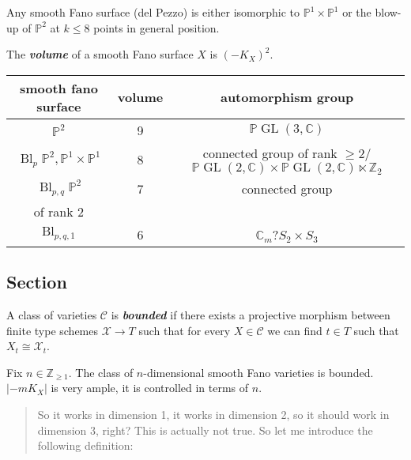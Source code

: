 \begin{thm}
	Any smooth Fano surface (del Pezzo) is either isomorphic to $\mathbb{P}^{1} \times \mathbb{P}^{1}$ or the blow-up of $\mathbb{P}^{2}$ at $k\leq 8$ points in general position.
\end{thm}

\begin{defn}
	The \textit{\textbf{volume}} of a smooth Fano surface  $X$ is $(-K_{X})^{2}$.
\end{defn}

\begin{tabular}{ccc}
	smooth fano surface&volume&automorphism group\\\hline
	$\mathbb{P}^{2}$ &9& $\mathbb{P}\operatorname{GL}(3,\mathbb{C})$\\\hline
	$\operatorname{Bl}_{p}\mathbb{P}^{2}, \mathbb{P}^{1} \times \mathbb{P}^{1}$ &8&connected group of rank $\geq 2$/$\mathbb{P}\operatorname{GL}(2,\mathbb{C})\times \mathbb{P}\operatorname{GL}(2,\mathbb{C})\ltimes \mathbb{Z}_{2}$ \\\hline
	$\operatorname{Bl}_{p,q}\mathbb{P}^{2}$ &7&connected group\\ of rank 2\\\hline
	$\operatorname{Bl}_{p,q,1}$ &6&$\mathbb{C}_{m}${\color{magenta}?}$ S_{2}\times S_{3}$
\end{tabular}

\subsection{Section}
\begin{defn}
	A class of varieties $\mathcal{C}$ is \textit{\textbf{bounded}} if there exists a projective morphism between finite type schemes $\mathcal{X}\to T$ such that for every $X\in \mathcal{C}$ we can find $t\in T$ such that $X_{t}\cong \mathcal{X}_{t}$.
\end{defn}

\begin{thm}
	Fix $n \in \mathbb{Z}_{\geq 1}$. The class of $n$-dimensional smooth Fano varieties is bounded. $|-mK_{X}|$ is very ample, it is controlled in terms of $n$.
\end{thm}

\begin{quotation}
	So it works in dimension 1, it works in dimension 2, so it should work in dimension 3, right? This is actually not true. So let me introduce the following definition:
\end{quotation}

